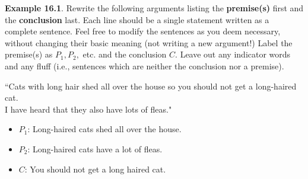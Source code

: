 \documentclass[aspectratio=169]{beamer}
\begin{document}
\begin{frame}[plain]{  }


 {\bf Example 16.1}.
   Rewrite the following arguments listing the {\bf premise(s)} first 
  and the {\bf conclusion} last.
  Each line should be a single statement written as a complete sentence.
   Feel free to modify the sentences as you deem necessary, without changing their basic meaning
   (not writing a new argument!) 
   Label the premise(s) as $P_1, P_2,$ etc. and the conclusion $C$.
   Leave out any indicator words and any fluff 
   (i.e., sentences which are neither the conclusion nor a premise).
  \medskip
  
  ``Cats with long hair shed all over the house so you should not get a long-haired cat.\\
  I have heard that they also have lots of fleas."\\
  \medskip
  \pause
  
  \begin{itemize}
   \item $P_1$: Long-haired cats shed all over the house.
   \item $P_2$: Long-haired cats have a lot of fleas.
   \item $C$: You should not get a long haired cat.
  \end{itemize}
     
   
\end{frame}


 
  
\end{document}
